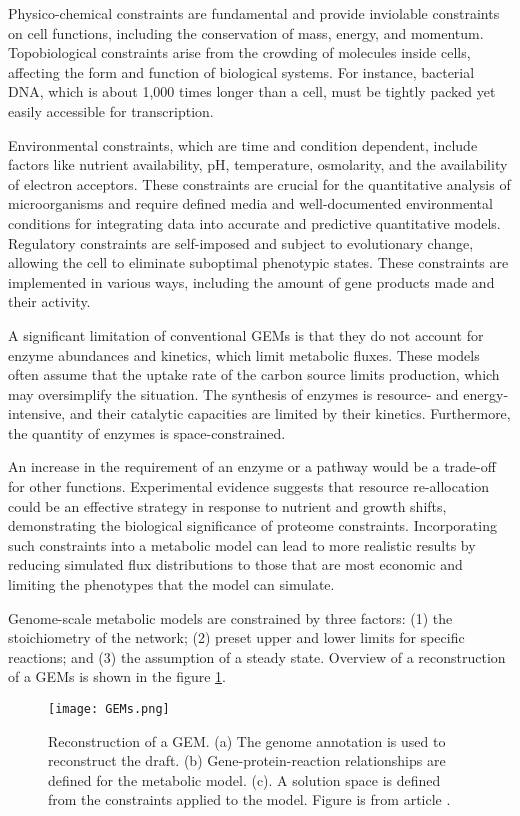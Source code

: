 Physico-chemical constraints are fundamental and provide inviolable constraints on cell functions, including the conservation of mass, energy, and momentum. Topobiological constraints arise from the crowding of molecules inside cells, affecting the form and function of biological systems. For instance, bacterial DNA, which is about 1,000 times longer than a cell, must be tightly packed yet easily accessible for transcription. \cite{Price2004}

Environmental constraints, which are time and condition dependent, include factors like nutrient availability, pH, temperature, osmolarity, and the availability of electron acceptors. These constraints are crucial for the quantitative analysis of microorganisms and require defined media and well-documented environmental conditions for integrating data into accurate and predictive quantitative models. Regulatory constraints are self-imposed and subject to evolutionary change, allowing the cell to eliminate suboptimal phenotypic states. These constraints are implemented in various ways, including the amount of gene products made and their activity. \cite{Price2004}

A significant limitation of conventional GEMs is that they do not account for enzyme abundances and kinetics, which limit metabolic fluxes. These models often assume that the uptake rate of the carbon source limits production, which may oversimplify the situation. \cite{Sanchez2017} The synthesis of enzymes is resource- and energy-intensive, and their catalytic capacities are limited by their kinetics. Furthermore, the quantity of enzymes is space-constrained. \cite{Kerkhoven2022}

An increase in the requirement of an enzyme or a pathway would be a trade-off for other functions. Experimental evidence suggests that resource re-allocation could be an effective strategy in response to nutrient and growth shifts, demonstrating the biological significance of proteome constraints. \cite{Chen2023} Incorporating such constraints into a metabolic model can lead to more realistic results by reducing simulated flux distributions to those that are most economic and limiting the phenotypes that the model can simulate. \cite{Kerkhoven2022}

Genome-scale metabolic models are constrained by three factors: (1) the stoichiometry of the network; (2) preset upper and lower limits for specific reactions; and (3) the assumption of a steady state. \cite{Kerkhoven2014} 
Overview of a reconstruction of a GEMs is shown in the figure \ref{GEMs}.
\begin{figure}[H]
    \texttt{[image: GEMs.png]}
    \caption{Reconstruction of a GEM. (a) The genome annotation is used 
    to reconstruct the draft. (b) Gene-protein-reaction relationships are defined for the metabolic model. 
     (c). A solution space is defined from the constraints applied to the model. Figure is from article \cite{Kerkhoven2014}.}
    \label{GEMs}
\end{figure}

